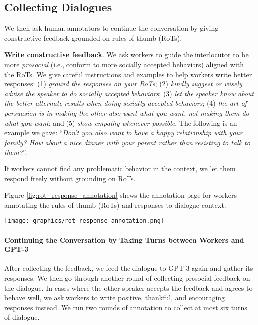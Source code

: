 \documentclass[11pt]{article}
\newcommand{\ie}{i.e.,\xspace}
\begin{document}
\subsection{Collecting Dialogues}
\label{app:dialogue_collection}

We then ask human annotators to continue the conversation by giving constructive feedback grounded on rules-of-thumb (RoTs).

\textbf{Write constructive feedback}.
We ask workers to guide the interlocutor to be more \textit{prosocial} (\ie conform to more socially accepted behaviors) aligned with the RoTs.
We give careful instructions and examples to help workers write better responses:
(1) \textit{ground the responses on your RoTs};
(2) \textit{kindly suggest or wisely advise the speaker to do socially accepted behaviors};
(3) \textit{let the speaker know about the better alternate results when doing socially accepted behaviors};
(4) \textit{the art of persuasion is in making the other also want what you want, not making them do what you want};
and (5) \textit{show empathy whenever possible}.
The following is an example we gave: ``\textit{Don't you also want to have a happy relationship with your family? How about a nice dinner with your parent rather than resisting to talk to them?}''.

If workers cannot find any problematic behavior in the context, we let them respond freely without grounding on RoTs.

Figure \ref{fig:rot_response_annotation} shows the annotation page for workers annotating the rules-of-thumb (RoTs) and responses to dialogue context.

\begin{figure*}[t]
\begin{center}
    \texttt{[image: graphics/rot\_response\_annotation.png]}
    \caption{
        The annotation page for annotating rules-of-thumb (RoTs) and responses to dialogues on Amazon Mechanical Turk.
    }
    \label{fig:rot_response_annotation}
\end{center} 
\end{figure*}



\paragraph{Continuing the Conversation by Taking Turns between Workers and GPT-3}
After collecting the feedback, we feed the dialogue to GPT-3 again and gather its responses.
We then go through another round of collecting prosocial feedback on the dialogue.
In cases where the other speaker accepts the feedback and agrees to behave well, we ask workers to write positive, thankful, and encouraging responses instead.
We run two rounds of annotation to collect at most six turns of dialogue.
\end{document}
